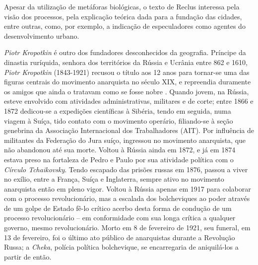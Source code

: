 \begin{citacao}
Apesar da utilização de metáforas biológicas, o texto de Reclus interessa pela visão dos processos, pela explicação teórica dada para a fundação das cidades, entre outras, como, por exemplo, a indicação de especuladores como agentes do desenvolvimento urbano. \cite[p.~65]{vasconcelos_dois_2012}
\end{citacao}

\textit{Piotr Kropotkin} é outro dos fundadores desconhecidos da geografia. Príncipe da dinastia ruríquida, senhora dos territórios da Rússia e Ucrânia entre 862 e 1610, \textit{Piotr Kropotkin }(1843-1921) recusou o título aos 12 anos para tornar-se uma das figuras centrais do movimento anarquista no século XIX, e repreendia duramente os amigos que ainda o tratavam como se fosse nobre \cite[p.~13]{baldwin_story_1970}. Quando jovem, na Rússia, esteve envolvido com atividades administrativas, militares e de corte; entre 1866 e 1872 dedicou-se a expedições científicas à Sibéria, tendo em seguida, numa viagem à  Suíça, tido contato com o movimento operário, filiando-se à seção genebrina da Associação Internacional dos Trabalhadores (AIT). Por influência de militantes da Federação do Jura suíço, ingressou no movimento anarquista, que não abandonou até sua morte. Voltou à Rússia ainda em 1872, e já em 1874 estava preso na fortaleza de Pedro e Paulo por sua atividade política com o \textit{Círculo Tchaikovsky}. Tendo escapado das prisões russas em 1876, passou a viver no exílio, entre a França, Suíça e Inglaterra, sempre ativo no movimento anarquista então em pleno vigor. Voltou à Rússia apenas em 1917 para colaborar com o processo revolucionário, mas a escalada dos bolcheviques ao poder através de um golpe de Estado fê-lo crítico acerbo desta forma de condução de um processo revolucionário -- em conformidade com sua longa crítica a qualquer governo, mesmo revolucionário. Morto em 8 de fevereiro de 1921, seu funeral, em 13 de fevereiro, foi o último ato público de anarquistas durante a Revolução Russa; a \textit{Cheka}, polícia política bolchevique, se encarregaria de aniquilá-los a partir de então.

